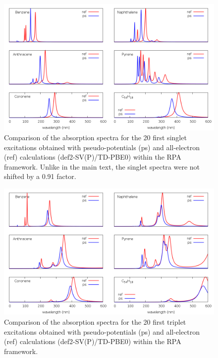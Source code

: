 \documentclass[aip]{revtex4-1}
\begin{document}
\begin{figure}
\begin{center}
\includegraphics[width=16cm]{grand_rpas}
\end{center}
\vspace{0.25in}
\hspace*{3in}
\caption{Comparison of the absorption spectra for the 20 first singlet excitations obtained with
pseudo-potentials (ps) and all-electron (ref) calculations (def2-SV(P)/TD-PBE0) within the RPA
framework.
Unlike in the main text, the singlet spectra were not shifted by a 0.91 factor.}
\label{fig:cnhn_uv_rpas}
\end{figure}


\begin{figure}
\begin{center}
\includegraphics[width=16cm]{grand_rpat}
\end{center}
\vspace{0.25in}
\hspace*{3in}
\caption{Comparison of the absorption spectra for the 20 first triplet excitations obtained with
pseudo-potentials (ps) and all-electron (ref) calculations (def2-SV(P)/TD-PBE0) within the RPA
framework.}
\label{fig:cnhn_uv_rpat}
\end{figure}
\end{document}
